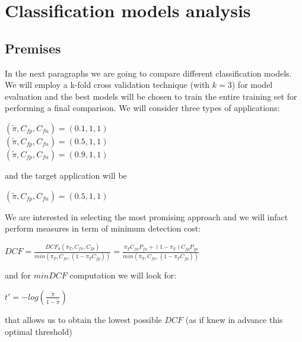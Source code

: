 \documentclass[10pt, a4paper, twocolumn]{article} %
\begin{document}
\section{Classification models analysis}
\subsection{Premises}
In the next paragraphs we are going to compare different classification models. 
We will employ a k-fold cross validation technique (with $k=3$) for model evaluation and the
best models will be chosen to train the entire training set for performing a final comparison.
We will consider three types of applications:
\begin{center}
	$(\tilde{\pi}, C_{fp}, C_{fn}) = (0.1, 1, 1)$\\
	$(\tilde{\pi}, C_{fp}, C_{fn}) = (0.5, 1, 1)$\\
	$(\tilde{\pi}, C_{fp}, C_{fn}) = (0.9, 1, 1)$\\
\end{center}
and the target application will be 
\begin{center}
	$(\tilde{\pi}, C_{fp}, C_{fn}) = (0.5, 1, 1)$
\end{center}
We are interested
in selecting the most promising approach and we will infact perform measures in term of minimum
detection cost:
\begin{center}
	\begin{math}
		DCF = \frac{DCF_{u}(\pi_{T}, C_{fn}, C_{fp})}{min(\pi_{T},C_{fn}, (1-\pi_{T}C_{fp}))} = 
			\frac{\pi_{T}C_{fn}P_{fn} + (1-\pi_{T})C_{fp}P_{fp}}{min(\pi_{T},C_{fn}, (1-\pi_{T}C_{fp}))}
	\end{math}
\end{center}
and for $minDCF$ computation we will look for:
\begin{center}
	\begin{math}
		t' = -log(\frac{\tilde{\pi}}{1-\tilde{\pi}})
	\end{math}
\end{center}
that allows us to obtain the lowest possible $DCF$ (as if knew in advance this optimal threshold)
\end{document}
